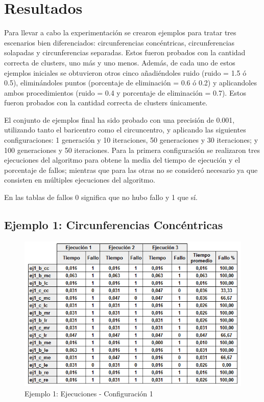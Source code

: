 \documentclass[conference,a4paper]{IEEEtran}
\begin{document}
\section{Resultados}

Para llevar a cabo la experimentación se crearon ejemplos para tratar tres escenarios bien diferenciados: circunferencias concéntricas, circunferencias solapadas y circunferencias separadas. Estos fueron probados con la cantidad correcta de clusters, uno más y uno menos. Además, de cada uno de estos ejemplos iniciales se obtuvieron otros cinco añadiéndoles ruido (ruido = 1.5 ó 0.5), eliminándoles puntos (porcentaje de eliminación = 0.6 ó 0.2) y aplicandoles ambos procedimientos (ruido = 0.4 y porcentaje de eliminación = 0.7). Estos fueron probados con la cantidad correcta de clusters únicamente.

El conjunto de ejemplos final ha sido probado con una precisión de 0.001, utilizando tanto el baricentro como el circuncentro, y aplicando las siguientes configuraciones: 1 generación y 10 iteraciones, 50 generaciones y 30 iteraciones; y 100 generaciones y 50 iteraciones. Para la primera configuración se realizaron tres ejecuciones del algoritmo para obtene la media del tiempo de ejecución y el porcentaje de fallos; mientras que para las otras no se consideró necesario ya que consisten en múltiples ejecuciones del algoritmo.

En las tablas de fallos 0 significa que no hubo fallo y 1 que sí.

\newpage
\subsection{Ejemplo 1: Circunferencias Concéntricas}

\begin{figure}[H]
\centering
\includegraphics[scale=0.5]{Experimentacion/Ejemplo1/Ejemplo1Ejecuciones}
\caption{Ejemplo 1: Ejecuciones - Configuración 1}
\end{figure}
\end{document}
